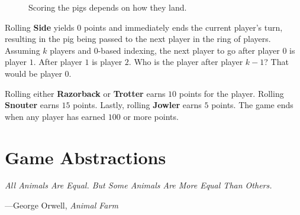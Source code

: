 \documentclass{article}
\begin{document}
\begin{figure}
{                \quad
        }
        \caption{Scoring the pigs depends on how they land.}\label{fig:pigs}
\end{figure}

Rolling \textbf{Side} yields $0$ points and immediately ends the current
player's turn, resulting in the pig being passed to the next player in
the ring of players. Assuming $k$ players and $0$-based indexing, the next
player to go after player $0$ is player $1$. After player $1$ is player $2$.
Who is the
player after player $k - 1$? That would be player $0$.

Rolling either \textbf{Razorback} or \textbf{Trotter} earns $10$ points
for the player. Rolling \textbf{Snouter} earns $15$ points. Lastly,
rolling \textbf{Jowler} earns $5$ points. The game ends when any player
has earned $100$ or more points.

\section{Game Abstractions}

\textwidth \epigraph{\emph{All Animals Are Equal. But
Some Animals Are More Equal Than Others.}}{---George Orwell,
\emph{Animal Farm}}
\end{document}
